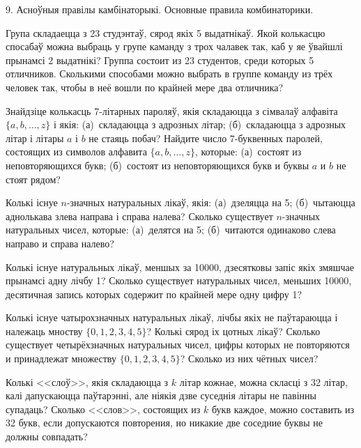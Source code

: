



\biLangHeader
{9. Асноўныя правілы камбінаторыкі.}
{Основные правила комбинаторики.}

\begin{problemList}

\problemItemSimple
{Група складаецца з 23 студэнтаў, сярод якіх 5 выдатнікаў. Якой колькасцю спосабаў можна выбраць у групе каманду з трох чалавек так, каб у яе ўвайшлі прынамсі 2 выдатнікі?}
{Группа состоит из 23 студентов, среди которых 5 отличников. Сколькими способами можно выбрать в группе команду из трёх человек так, чтобы в неё вошли по крайней мере два отличника?}

\bigskip

\problemItemSimple
{Знайдзіце колькасць 7-літарных пароляў, якія складаюцца з сімвалаў алфавіта $\{a, b, \dots, z \}$ і якія: (а)~складаюцца з адрозных літар; (б)~складаюцца з адрозных літар і літары $a$ і $b$ не стаяць побач?}
{Найдите число 7-буквенных паролей, состоящих из символов алфавита $\{a, b, \dots, z \}$, которые: (а)~состоят из неповторяющихся букв; (б)~состоят из неповторяющихся букв и буквы $a$ и $b$ не стоят рядом?}

\bigskip

\problemItemSimple
{Колькі існуе $n$-значных натуральных лікаў, якія: (а)~дзеляцца на 5; (б)~чытаюцца аднолькава злева направа і справа налева?}
{Сколько существует $n$-значных натуральных чисел, которые: (а)~делятся на 5; (б)~читаются одинаково слева направо и справа налево?}

\bigskip

\problemItemSimple
{Колькі існуе натуральных лікаў, меншых за 10000, дзесятковы запіс якіх змяшчае прынамсі адну лічбу 1?}
{Сколько существует натуральных чисел, меньших 10000, десятичная запись которых содержит по крайней мере одну цифру 1?}

\bigskip

\problemItemSimple
{Колькі існуе чатырохзначных натуральных лікаў, лічбы якіх не паўтараюцца і належаць мноству $\{0, 1, 2, 3, 4, 5\}$? Колькі сярод іх цотных лікаў?}
{Сколько существует четырёхзначных натуральных чисел, цифры которых не повторяются и принадлежат множеству $\{0, 1, 2, 3, 4, 5\}$? Сколько из них чётных чисел?}

\bigskip

\problemItemSimple
{Колькі <<слоў>>, якія складаюцца з $k$ літар кожнае, можна скласці з 32 літар, калі дапускаюцца паўтарэнні, але ніякія дзве суседнія літары не павінны супадаць?}
{Сколько <<слов>>, состоящих из $k$ букв каждое, можно составить из 32 букв, если допускаются повторения, но никакие две соседние буквы не должны совпадать?}


\end{problemList}
